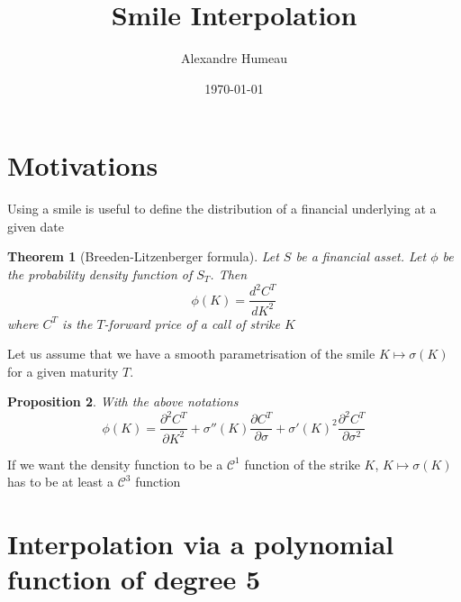 \documentclass{article}
\newtheorem{theorem}{Theorem}[section]
\newtheorem{proposition}[theorem]{Proposition}
\begin{document}
\title{Smile Interpolation}
\author{Alexandre Humeau}
\date{\today}
\maketitle

\section{Motivations}
Using a smile is useful to define the distribution of a financial underlying at a given date

\begin{theorem}[Breeden-Litzenberger formula]
	Let $S$ be a financial asset. Let $\phi$ be the probability density function of $S_T$. Then
	\begin{equation}
		\phi(K) = \frac{d^2C^T}{dK^2}
	\end{equation}
	where $C^T$ is the $T$-forward price of a call of strike $K$
\end{theorem}

\noindent Let us assume that we have a smooth parametrisation of the smile $K \mapsto \sigma(K)$ for a given maturity $T$.

\begin{proposition}
	With the above notations
	\begin{equation}
		\phi(K) = \frac{\partial ^2 C^T}{\partial K^2} + \sigma''(K) \frac{\partial C^T}{\partial \sigma} + \sigma'(K)^2 \frac{\partial^2 C^T}{\partial \sigma^2}
	\end{equation}
\end{proposition}

If we want the density function to be a $\mathcal{C}^1$ function of the strike $K$, $K\mapsto \sigma(K)$ has to be at least a $\mathcal{C}^3$ function

\section{Interpolation via a polynomial function of degree 5}
\end{document}
